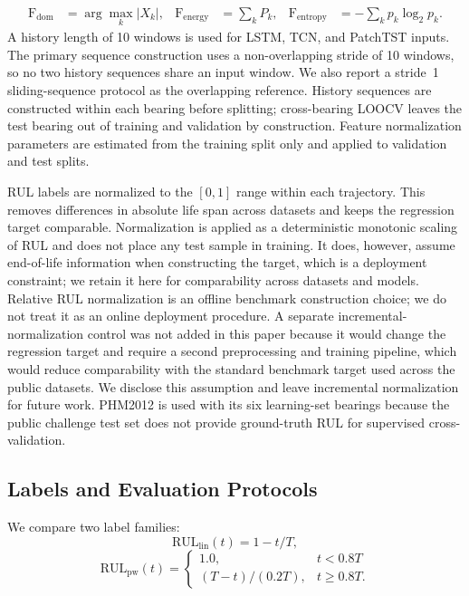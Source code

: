 \documentclass[pdflatex,sn-basic,NameDate]{sn-jnl}
\begin{document}
\begin{align}
\mathrm{F}_{\mathrm{dom}} &= \arg\max_k |X_k|, &
\mathrm{F}_{\mathrm{energy}} &= \sum_k P_k, &
\mathrm{F}_{\mathrm{entropy}} &= -\sum_k p_k \log_2 p_k. \nonumber
\end{align}
A history length of 10 windows is used for LSTM, TCN, and PatchTST inputs. The primary sequence construction uses a non-overlapping stride of 10 windows, so no two history sequences share an input window. We also report a stride~1 sliding-sequence protocol as the overlapping reference. History sequences are constructed within each bearing before splitting; cross-bearing LOOCV leaves the test bearing out of training and validation by construction. Feature normalization parameters are estimated from the training split only and applied to validation and test splits.

RUL labels are normalized to the $[0,1]$ range within each trajectory. This removes differences in absolute life span across datasets and keeps the regression target comparable. Normalization is applied as a deterministic monotonic scaling of RUL and does not place any test sample in training. It does, however, assume end-of-life information when constructing the target, which is a deployment constraint; we retain it here for comparability across datasets and models. Relative RUL normalization is an offline benchmark construction choice; we do not treat it as an online deployment procedure. A separate incremental-normalization control was not added in this paper because it would change the regression target and require a second preprocessing and training pipeline, which would reduce comparability with the standard benchmark target used across the public datasets. We disclose this assumption and leave incremental normalization for future work. PHM2012 is used with its six learning-set bearings because the public challenge test set does not provide ground-truth RUL for supervised cross-validation.

\subsection{Labels and Evaluation Protocols}
We compare two label families:
\begin{equation}
\text{RUL}_{\text{lin}}(t) = 1 - t/T,
\label{eq:linear}
\end{equation}
\begin{equation}
\text{RUL}_{\text{pw}}(t) =
\begin{cases}
1.0, & t < 0.8T \\
(T - t)/(0.2T), & t \geq 0.8T.
\end{cases}
\label{eq:piecewise}
\end{equation}
\end{document}
